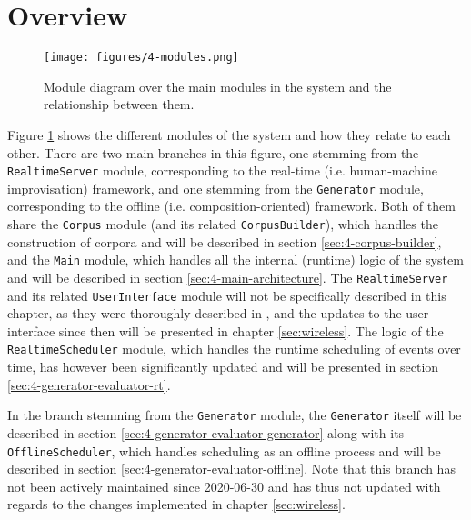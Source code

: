 \section{Overview}\label{sec:4-overview}
 \begin{figure}[h]
    \centering        
 	\texttt{[image: figures/4-modules.png]}
    \caption{Module diagram over the main modules in the system and the relationship between them.}
    \label{fig:4-modules}
\end{figure}

\noindent Figure \ref{fig:4-modules} shows the different modules of the system and how they relate to each other. There are two main branches in this figure, one stemming from the \texttt{RealtimeServer} module, corresponding to the real-time (i.e. human-machine improvisation) framework, and one stemming from the \texttt{Generator} module, corresponding to the offline (i.e. composition-oriented) framework. Both of them share the \texttt{Corpus} module (and its related \texttt{CorpusBuilder}), which handles the construction of corpora and will be described in section \ref{sec:4-corpus-builder}, and the \texttt{Main} module, which handles all the internal (runtime) logic of the system and will be described in section \ref{sec:4-main-architecture}. The \texttt{RealtimeServer} and its related \texttt{UserInterface} module will not be specifically described in this chapter, as they were thoroughly described in \cite{borg_2019}, and the updates to the user interface since then will be presented in chapter \ref{sec:wireless}. The logic of the \texttt{RealtimeScheduler} module, which handles the runtime scheduling of events over time, has however been significantly updated and will be presented in section \ref{sec:4-generator-evaluator-rt}. 

In the branch stemming from the \texttt{Generator} module, the \texttt{Generator} itself will be described in section \ref{sec:4-generator-evaluator-generator} along with its \texttt{OfflineScheduler}, which handles scheduling as an offline process and will be described in section \ref{sec:4-generator-evaluator-offline}. Note that this branch has not been actively maintained since 2020-06-30 and has thus not updated with regards to the changes implemented in chapter \ref{sec:wireless}.